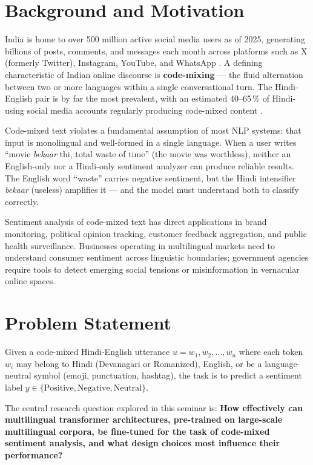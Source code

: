 \documentclass[12pt,a4paper]{report}
\begin{document}
\section{Background and Motivation}

India is home to over 500 million active social media users as of 2025, generating billions of posts, comments, and messages each month across platforms such as X (formerly Twitter), Instagram, YouTube, and WhatsApp \cite{statista2025}. A defining characteristic of Indian online discourse is \textbf{code-mixing} — the fluid alternation between two or more languages within a single conversational turn. The Hindi-English pair is by far the most prevalent, with an estimated 40--65\,\% of Hindi-using social media accounts regularly producing code-mixed content \cite{bali2014}.

Code-mixed text violates a fundamental assumption of most NLP systems: that input is monolingual and well-formed in a single language. When a user writes ``movie \emph{bekaar} thi, total waste of time'' (the movie was worthless), neither an English-only nor a Hindi-only sentiment analyzer can produce reliable results. The English word ``waste'' carries negative sentiment, but the Hindi intensifier \emph{bekaar} (useless) amplifies it — and the model must understand both to classify correctly.

Sentiment analysis of code-mixed text has direct applications in brand monitoring, political opinion tracking, customer feedback aggregation, and public health surveillance. Businesses operating in multilingual markets need to understand consumer sentiment across linguistic boundaries; government agencies require tools to detect emerging social tensions or misinformation in vernacular online spaces.

\section{Problem Statement}

Given a code-mixed Hindi-English utterance $u = w_1, w_2, \ldots, w_n$ where each token $w_i$ may belong to Hindi (Devanagari or Romanized), English, or be a language-neutral symbol (emoji, punctuation, hashtag), the task is to predict a sentiment label $y \in \{\text{Positive}, \text{Negative}, \text{Neutral}\}$.

The central research question explored in this seminar is: \textbf{How effectively can multilingual transformer architectures, pre-trained on large-scale multilingual corpora, be fine-tuned for the task of code-mixed sentiment analysis, and what design choices most influence their performance?}
\end{document}
